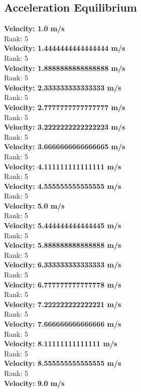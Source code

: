 \documentclass{article}
\begin{document}
\subsection*{Acceleration Equilibrium}
\textbf{Velocity: 1.0 m/s}\\
Rank: 5\\
\textbf{Velocity: 1.4444444444444444 m/s}\\
Rank: 5\\
\textbf{Velocity: 1.8888888888888888 m/s}\\
Rank: 5\\
\textbf{Velocity: 2.333333333333333 m/s}\\
Rank: 5\\
\textbf{Velocity: 2.7777777777777777 m/s}\\
Rank: 5\\
\textbf{Velocity: 3.2222222222222223 m/s}\\
Rank: 5\\
\textbf{Velocity: 3.6666666666666665 m/s}\\
Rank: 5\\
\textbf{Velocity: 4.111111111111111 m/s}\\
Rank: 5\\
\textbf{Velocity: 4.555555555555555 m/s}\\
Rank: 5\\
\textbf{Velocity: 5.0 m/s}\\
Rank: 5\\
\textbf{Velocity: 5.444444444444445 m/s}\\
Rank: 5\\
\textbf{Velocity: 5.888888888888888 m/s}\\
Rank: 5\\
\textbf{Velocity: 6.333333333333333 m/s}\\
Rank: 5\\
\textbf{Velocity: 6.777777777777778 m/s}\\
Rank: 5\\
\textbf{Velocity: 7.222222222222221 m/s}\\
Rank: 5\\
\textbf{Velocity: 7.666666666666666 m/s}\\
Rank: 5\\
\textbf{Velocity: 8.11111111111111 m/s}\\
Rank: 5\\
\textbf{Velocity: 8.555555555555555 m/s}\\
Rank: 5\\
\textbf{Velocity: 9.0 m/s}\\
\end{document}
